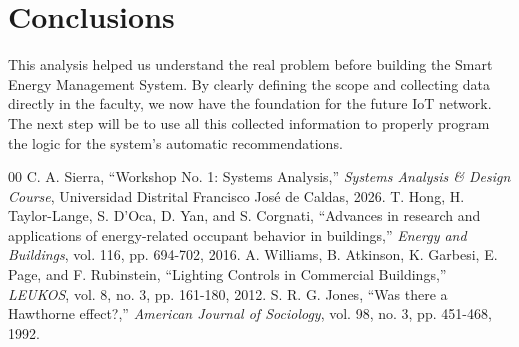 \documentclass[conference]{IEEEtran}
\begin{document}
\section{Conclusions}
This analysis helped us understand the real problem before building the Smart Energy Management System. By clearly defining the scope and collecting data directly in the faculty, we now have the foundation for the future IoT network. The next step will be to use all this collected information to properly program the logic for the system's automatic recommendations.

\begin{thebibliography}{00}
 C. A. Sierra, ``Workshop No. 1: Systems Analysis,'' \textit{Systems Analysis \& Design Course}, Universidad Distrital Francisco José de Caldas, 2026.
 T. Hong, H. Taylor-Lange, S. D'Oca, D. Yan, and S. Corgnati, ``Advances in research and applications of energy-related occupant behavior in buildings,'' \textit{Energy and Buildings}, vol. 116, pp. 694-702, 2016.
 A. Williams, B. Atkinson, K. Garbesi, E. Page, and F. Rubinstein, ``Lighting Controls in Commercial Buildings,'' \textit{LEUKOS}, vol. 8, no. 3, pp. 161-180, 2012.
 S. R. G. Jones, ``Was there a Hawthorne effect?,'' \textit{American Journal of Sociology}, vol. 98, no. 3, pp. 451-468, 1992.
\end{thebibliography}
\end{document}
